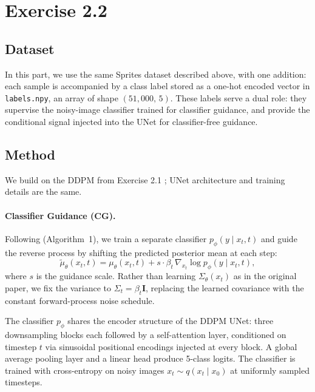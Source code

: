 \section{Exercise 2.2}

\subsection{Dataset}
In this part, we use the same Sprites dataset described above, with one addition: each sample is accompanied by a class label stored as a one-hot encoded vector in \texttt{labels.npy}, an array of shape $(51{,}000,\, 5)$. These labels serve a dual role: they supervise the noisy-image classifier trained for classifier guidance, and provide the conditional signal injected into the UNet for classifier-free guidance.

\subsection{Method}
We build on the DDPM from Exercise 2.1 \cite{ho2020denoisingdiffusionprobabilisticmodels}; UNet architecture and training details are the same.

\paragraph{Classifier Guidance (CG).}
Following \citet{dhariwal2021diffusionmodelsbeatgans} (Algorithm~1), we train a separate classifier $p_\phi(y \mid x_t, t)$ and guide the reverse process by shifting the predicted posterior mean at each step:
\[
    \tilde{\mu}_\theta(x_t, t) = \mu_\theta(x_t, t) + s \cdot \beta_t \,\nabla_{x_t} \log p_\phi(y \mid x_t, t),
\]
where $s$ is the guidance scale. Rather than learning $\Sigma_\theta(x_t)$ as in the original paper, we fix the variance to $\Sigma_t = \beta_t \mathbf{I}$, replacing the learned covariance with the constant forward-process noise schedule.


The classifier $p_\phi$ shares the encoder structure of the DDPM UNet: three downsampling blocks each followed by a self-attention layer, conditioned on timestep $t$ via sinusoidal positional encodings injected at every block. A global average pooling layer and a linear head produce 5-class logits. The classifier is trained with cross-entropy on noisy images $x_t \sim q(x_t \mid x_0)$ at uniformly sampled timesteps.

